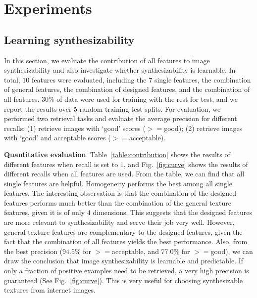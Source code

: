 \documentclass[10pt,twocolumn,letterpaper]{article}
\begin{document}
\section{Experiments}
\label{sec:experiment}

\subsection{Learning synthesizability}

In this section, we evaluate the contribution of all features to image
synthesizability and also investigate whether synthesizability is
learnable. In total, $10$ features were evaluated, including the $7$
single features, the combination of general features, the combination
of designed features, and the combination of all features.  $30\%$ of
data were used for training with the rest for test, and we report the
results over $5$ random training-test splits. For evaluation, we
performed two retrieval tasks and evaluate the average precision for
different recalls: (1) retrieve images with `good' scores ($>=$good);
(2) retrieve images with `good' and acceptable scores
($>=$acceptable).


\textbf{Quantitative evaluation}. Table~\ref{table:contribution} shows
the results of different features when recall is set to $1$, and
Fig.~\ref{fig:curve} shows the results of different recalls when all
features are used.  From the table, we can find that all single
features are helpful. Homogeneity performs the best among all single
features. The interesting observation is that the combination of the
designed features performs much better than the combination of the
general texture features, given it is of only $4$ dimensions. This
suggests that the designed features are more relevant to
synthesizability and serve their job very well. However, general
texture features are complementary to the designed features, given the
fact that the combination of all features yields the best
performance. Also, from the best precision ($94.5\%$ for
$>=$acceptable, and $77.0\%$ for $>=$good), we can draw the conclusion
that image synthesizability is learnable and predictable. If only a
fraction of positive examples need to be retrieved, a very high
precision is guaranteed (See Fig.~\ref{fig:curve}). This is very
useful for choosing synthesizable textures from internet images. 
\end{document}
